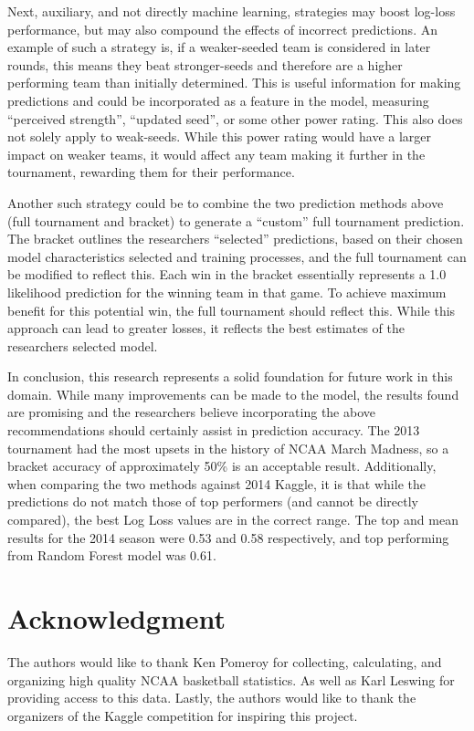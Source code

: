 \documentclass[conference]{IEEEtran}
\begin{document}
{Next, auxiliary, and not directly machine learning, strategies may boost log-loss performance, but may also compound the effects of incorrect predictions. 
An example of such a strategy is, if a weaker-seeded team is considered in later rounds, this means they beat stronger-seeds and therefore are a higher performing team than initially determined.
This is useful information for making predictions and could be incorporated as a feature in the model, measuring ``perceived strength'', ``updated seed'', or some other power rating. 
This also does not solely apply to weak-seeds. 
While this power rating would have a larger impact on weaker teams, it would affect any team making it further in the tournament, rewarding them for their performance.

Another such strategy could be to combine the two prediction methods above (full tournament and bracket) to generate a ``custom'' full tournament prediction. 
The bracket outlines the researchers ``selected'' predictions, based on their chosen model characteristics selected and training processes, and the full tournament can be modified to reflect this.
Each win in the bracket essentially represents a 1.0 likelihood prediction for the winning team in that game. 
To achieve maximum benefit for this potential win, the full tournament should reflect this. 
While this approach can lead to greater losses, it reflects the best estimates of the researchers selected model.

In conclusion, this research represents a solid foundation for future work in this domain. 
While many improvements can be made to the model, the results found are promising and the researchers believe incorporating the above recommendations should certainly assist in prediction accuracy. 
The 2013 tournament had the most upsets in the history of NCAA March Madness, so a bracket accuracy of approximately 50\% is an acceptable result.
Additionally, when comparing the two methods against 2014 Kaggle, it is that while the predictions do not match those of top performers (and cannot be directly compared), the best Log Loss values are in the correct range. 
The top and mean results for the 2014 season were 0.53 and 0.58 respectively, and top performing from Random Forest model was 0.61. 

\section*{Acknowledgment}
The authors would like to thank Ken Pomeroy for collecting, calculating, and organizing high quality NCAA basketball statistics. As well as Karl Leswing for providing access to this data. Lastly, the authors would like to thank the organizers of the Kaggle competition for inspiring this project.


}
\end{document}
